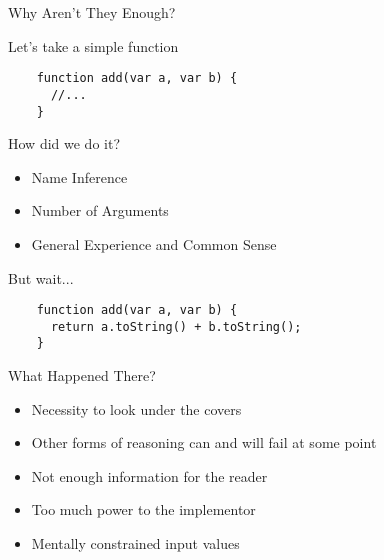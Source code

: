\begin{section}{Why Aren't They Enough?}

\begin{frame}[fragile]{Let's take a simple function}
  \begin{verbatim}
    function add(var a, var b) {
      //...
    }
  \end{verbatim}
\end{frame}

\begin{frame}{How did we do it?}
  \begin{center}
    \begin{itemize}
    \item Name Inference
    \item Number of Arguments
    \item General Experience and Common Sense
    \end{itemize}
\end{center}
\end{frame}

\begin{frame}[fragile]{But wait...}
  \begin{verbatim}
    function add(var a, var b) {
      return a.toString() + b.toString();
    }
  \end{verbatim}
\end{frame}

\begin{frame}{What Happened There?}
  \begin{itemize}
    \item Necessity to look under the covers
    \item Other forms of reasoning can and will fail at some point
    \item Not enough information for the reader
    \item Too much power to the implementor
    \item Mentally constrained input values
  \end{itemize}
\end{frame}

\end{section}
